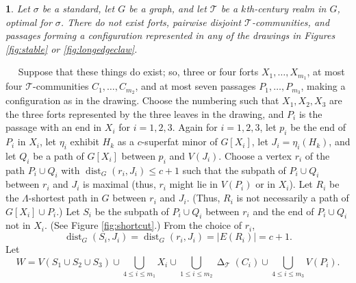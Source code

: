 \documentclass[titlepage,11pt]{article}
\def\LL{,\ldots,}
\newcommand{\dist}{\operatorname{dist}}
\newcommand{\voro}{\operatorname{\Delta}}
\newcommand{\mac}{\mathcal}
\newtheorem{thm}{}[section]
\newcommand{\Proof}{\noindent{\bf Proof.}\ \ }
\begin{document}
	\begin{thm}\label{newaddclaw}
		Let $\sigma$ be a standard, let $G$ be a graph, and let 
		$\mathcal{T}$ be a $k$th-century realm in $G$, optimal for $\sigma$.
		There do not exist forts, pairwise disjoint $\mac T$-communities, and passages forming a configuration represented in any of the drawings in 
		Figures \ref{fig:stable} or \ref{fig:longedgeclaw}.
	\end{thm}
	\Proof
	Suppose that these things do exist; so, three or four forts $X_1\LL X_{m_1}$, at most four $\mac T$-communities $C_1\LL C_{m_2}$, 
	and at most seven passages $P_1\LL P_{m_3}$, making a configuration as in the drawing. 
	Choose the numbering such that $X_1,X_2,X_3$ are the three forts represented by the three leaves in the drawing, and $P_i$ is 
	the passage with an end in $X_i$ for $i = 1,2,3$. Again for $i = 1,2,3$, let $p_i$ be the end of $P_i$ in $X_i$, let $\eta_i$ exhibit $H_k$
	as a $c$-superfat minor of $G[X_i]$, let $J_i = \eta_i(H_k)$, and let $Q_i$ be a path of $G[X_i]$ between $p_i$ and $V(J_i)$. Choose a vertex $r_i$
	of the path $P_i\cup Q_i$ with $\dist_G(r_i, J_i)\le c+1$ such that the subpath of $P_i\cup Q_i$ between $r_i$ and $J_i$
	is maximal (thus, $r_i$ might lie in $V(P_i)$ or
	in $X_i$). Let $R_i$ be the $\Lambda$-shortest path in $G$ between $r_i$ and $J_i$. (Thus, $R_i$ is not necessarily a path of 
	$G[X_i]\cup P_i$.) Let $S_i$ be the subpath of $P_i\cup Q_i$ between $r_i$ and the end of $P_i\cup Q_i$ not in $X_i$. (See Figure \ref{fig:shortcut}.)
	From the choice of $r_i$, 
	$$\dist_G(S_i,J_i) = \dist_G(r_i, J_i) =|E(R_i)|=c+1.$$ 
	Let
	$$W=V(S_1\cup S_2\cup S_3)\cup \bigcup_{4\le i\le m_1} X_i \cup \bigcup_{1\le i\le m_2}\voro_{\mac T}(C_i) \cup \bigcup_{4\le i\le m_3} V(P_i).$$
\end{document}
